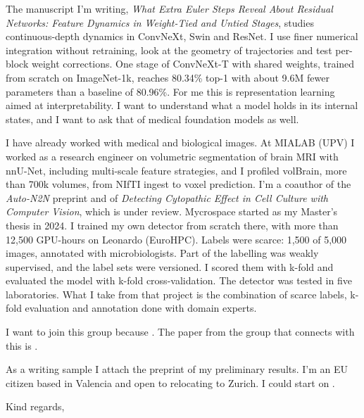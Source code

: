 \documentclass[11pt, a4paper]{../awesome-cv}
\begin{document}
The manuscript I'm writing, \textit{What Extra Euler Steps Reveal About Residual Networks: Feature Dynamics in Weight-Tied and Untied Stages}, studies continuous-depth dynamics in ConvNeXt, Swin and ResNet. I use finer numerical integration without retraining, look at the geometry of trajectories and test per-block weight corrections. One stage of ConvNeXt-T with shared weights, trained from scratch on ImageNet-1k, reaches 80.34\% top-1 with about 9.6M fewer parameters than a baseline of 80.96\%. For me this is representation learning aimed at interpretability. I want to understand what a model holds in its internal states, and I want to ask that of medical foundation models as well.

I have already worked with medical and biological images. At MIALAB (UPV) I worked as a research engineer on volumetric segmentation of brain MRI with nnU-Net, including multi-scale feature strategies, and I profiled volBrain, more than 700k volumes, from NIfTI ingest to voxel prediction. I'm a coauthor of the \textit{Auto-N2N} preprint and of \textit{Detecting Cytopathic Effect in Cell Culture with Computer Vision}, which is under review.
Mycrospace started as my Master's thesis in 2024. I trained my own detector from scratch there, with more than 12,500 GPU-hours on Leonardo (EuroHPC). Labels were scarce: 1,500 of 5,000 images, annotated with microbiologists. Part of the labelling was weakly supervised, and the label sets were versioned. I scored them with k-fold and evaluated the model with k-fold cross-validation. The detector was tested in five laboratories. What I take from that project is the combination of scarce labels, k-fold evaluation and annotation done with domain experts.

I want to join this group because
.
The paper from the group that connects with this is
.

As a writing sample I attach the preprint of my preliminary results. I'm an EU citizen based in Valencia and open to relocating to Zurich. I could start on
.

\vspace{1.2mm}
Kind regards,

\vspace{3.2mm}
{}
\end{document}
